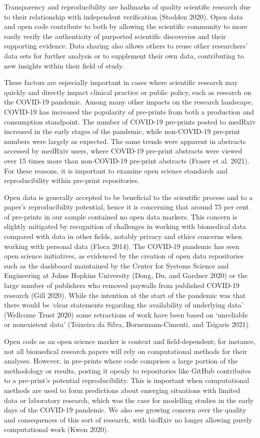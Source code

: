 \documentclass[
]{article}
\begin{document}
Transparency and reproducibility are hallmarks of quality scientific research due to their relationship with independent verification (Stodden 2020). Open data and open code contribute to both by allowing the scientific community to more easily verify the authenticity of purported scientific discoveries and their supporting evidence. Data sharing also allows others to reuse other researchers' data sets for further analysis or to supplement their own data, contributing to new insights within their field of study.

These factors are especially important in cases where scientific research may quickly and directly impact clinical practice or public policy, such as research on the COVID-19 pandemic. Among many other impacts on the research landscape, COVID-19 has increased the popularity of pre-prints from both a production and consumption standpoint. The number of COVID-19 pre-prints posted to medRxiv increased in the early stages of the pandemic, while non-COVID-19 pre-print numbers were largely as expected. The same trends were apparent in abstracts accessed by medRxiv users, where COVID-19 pre-print abstracts were viewed over 15 times more than non-COVID-19 pre-print abstracts (Fraser et al. 2021). For these reasons, it is important to examine open science standards and reproducibility within pre-print repositories.

Open data is generally accepted to be beneficial to the scientific process and to a paper's reproducibility potential, hence it is concerning that around 75 per cent of pre-prints in our sample contained no open data markers. This concern is slightly mitigated by recognition of challenges in working with biomedical data compared with data in other fields, notably privacy and ethics concerns when working with personal data (Floca 2014). The COVID-19 pandemic has seen open science initiatives, as evidenced by the creation of open data repositories such as the dashboard maintained by the Center for Systems Science and Engineering at Johns Hopkins University (Dong, Du, and Gardner 2020) or the large number of publishers who removed paywalls from published COVID-19 research (Gill 2020). While the intention at the start of the pandemic was that there would be `clear statements regarding the availability of underlying data' (Wellcome Trust 2020) some retractions of work have been based on `unreliable or nonexistent data' (Teixeira da Silva, Bornemann-Cimenti, and Tsigaris 2021).

Open code as an open science marker is context and field-dependent; for instance, not all biomedical research papers will rely on computational methods for their analyses. However, in pre-prints where code comprises a large portion of the methodology or results, posting it openly to repositories like GitHub contributes to a pre-print's potential reproducibility. This is important when computational methods are used to form predictions about emerging situations with limited data or laboratory research, which was the case for modelling studies in the early days of the COVID-19 pandemic. We also see growing concern over the quality and consequences of this sort of research, with bioRxiv no longer allowing purely computational work (Kwon 2020).
\end{document}
